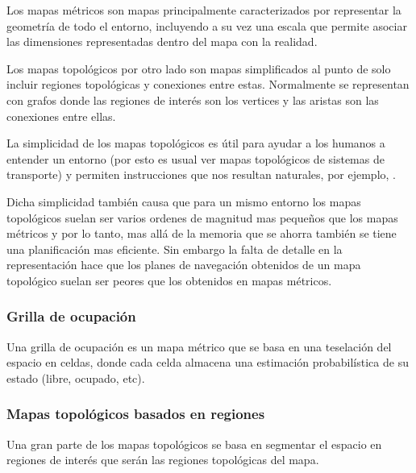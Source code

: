 Los mapas métricos son mapas principalmente caracterizados por representar la geometría de todo el entorno, incluyendo a su vez una escala que permite asociar las dimensiones representadas dentro del mapa con la realidad.

Los mapas topológicos por otro lado son mapas simplificados al punto de solo incluir regiones topológicas y conexiones entre estas. Normalmente se representan con grafos donde las regiones de interés son los vertices y las aristas son las conexiones entre ellas.

La simplicidad de los mapas topológicos es útil para ayudar a los humanos a entender un entorno (por esto es usual ver mapas topológicos de sistemas de transporte) y permiten instrucciones que nos resultan naturales, por ejemplo, .

Dicha simplicidad también causa que para un mismo entorno los mapas topológicos suelan ser varios ordenes de magnitud mas pequeños que los mapas métricos y por lo tanto, mas allá de la memoria que se ahorra también se tiene una planificación mas eficiente. Sin embargo la falta de detalle en la representación hace que los planes de navegación obtenidos de un mapa topológico suelan ser peores que los obtenidos en mapas métricos.

\subsubsection{Grilla de ocupación}
Una grilla de ocupación es un mapa métrico que se basa en una teselación del espacio en celdas, donde cada celda almacena una estimación probabilística de su estado (libre, ocupado, etc). 







\subsubsection{Mapas topológicos basados en regiones}
Una gran parte de los mapas topológicos se basa en segmentar el espacio en regiones de interés que serán las regiones topológicas del mapa. 

